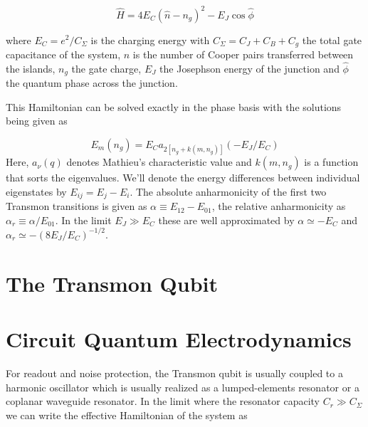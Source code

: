 \begin{equation}
\hat{H} = 4 E_C \left( \hat{n} - n_g\right)^2-E_J \cos{\hat{\phi}}
\end{equation}

where $E_C = e^2 / C_\Sigma$ is the charging energy with $C_\Sigma = C_J+C_B+C_g$ the total gate capacitance of the system, $\hat{n}$ is the number of Cooper pairs transferred between the islands, $n_g$ the gate charge, $E_J$ the Josephson energy of the junction and $\hat{\phi}$ the quantum phase across the junction.

This Hamiltonian can be solved exactly in the phase basis with the solutions being given as\citep{koch_charge-insensitive_2007,cottet_implementation_2002}

\begin{equation}
E_m(n_g) = E_C a_{2[n_g+k(m,n_g)]}(-E_J/E_C)
\end{equation}
Here, $a_\nu(q)$ denotes  Mathieu's characteristic value and $k(m,n_g)$ is a function that sorts the eigenvalues. We'll denote the energy differences between individual eigenstates by $E_{ij} = E_j - E_i$. The absolute anharmonicity of the first two Transmon transitions is given as $\alpha \equiv E_{12}-E_{01}$, the relative anharmonicity as $\alpha_r \equiv \alpha / E_{01}$. In the limit $E_J \gg E_C$ these are well approximated by $\alpha \simeq -E_C$ and $\alpha_r \simeq -(8E_J / E_C)^{-1/2}$.

\section{The Transmon Qubit}

\section{Circuit Quantum Electrodynamics}

For readout and noise protection, the Transmon qubit is usually coupled to a harmonic oscillator which is usually realized as a lumped-elements resonator or a coplanar waveguide resonator. In the limit where the resonator capacity $C_r \gg C_\Sigma$ we can write the effective Hamiltonian of the system as

